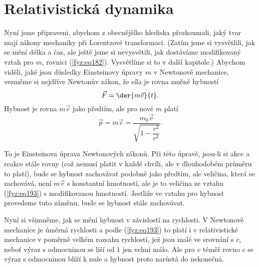   \section{Relativistická dynamika}\label{fyz:IchapXVsecX}
    Nyní jsme připraveni, abychom z obecnějšího hlediska přezkoumali, jaký tvar mají zákony 
    mechaniky při Lorentzové transformaci. (Zatím jsme si vysvětlili, jak se mění délka a čas, ale 
    ještě jsme si nevysvětili, jak dostáváme modifikovaný vztah pro \(m\), rovnici 
    (\ref{fyz:eq182}). Vysvětlíme si to v další kapitole.) Abychom viděli, jaké jsou důsledky 
    Einsteinovy úpravy \(m\) v Newtonově mechanice, vezměme si nejdříve Newtonův zákon, že síla je 
    rovna změně hybností
    \begin{equation}\label{fyz:eq192}
      \vec{F} = \der{m\vec{v}}{t}.
    \end{equation}
    Hybnost je rovna \(m\vec{v}\) jako předtím, ale pro nové \(m\) platí
    \begin{equation}\label{fyz:eq193}
      \vec{p} = m\vec{v} = \frac{m_0\vec{v}}{\sqrt{1-\dfrac{v^2}{c^2}}}.
    \end{equation}
    
    To je Einsteinova úprava Newtonových zákonů. Při této úpravě, jsou-li si akce a reakce stále 
    rovny (což nemusí platit v každé chvíli, ale v dlouhodobém průměru to platí), bude se hybnost 
    zachovávat podobně jako předtím, ale veličina, která se zachovává, není \(m\vec{v}\) s 
    konstantní hmotností, ale je to veličina ze vztahu (\ref{fyz:eq193}) s modifikovanou hmotností. 
    Jestliže ve vztahu pro hybnost provedeme tuto záměnu, bude se hybnost stále zachovávat.
    
    Nyní si všimněme, jak se mění hybnost v závislostí na rychlosti. V Newtonově mechanice je 
    úměrná rychlosti a podle (\ref{fyz:eq193}) to platí i v relativistické mechanice v poměrně 
    velkém rozsahu rychlostí, jež jsou malé ve srovnání s \(c\), neboť výraz s odmocninou se liší 
    od \(1\) jen velmi málo. Ale pro \(v\) téměř rovno \(c\) se výraz s odmocninou blíží k nule a 
    hybnost proto narůstá do nekonečná. 
    
